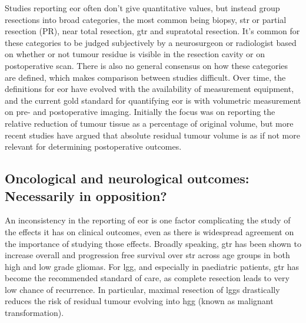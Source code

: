 Studies reporting \gls{eor} often don't give quantitative values, but instead group resections into broad categories, the most common being biopsy, \gls{str} or partial resection (PR), near total resection, \gls{gtr} and supratotal resection\autocite{Wykes2021,Karschnia2021}.
It's common for these categories to be judged subjectively by a neurosurgeon or radiologist based on whether or not tumour residue is visible in the resection cavity or on postoperative scan.
There is also no general consensus on how these categories are defined, which makes comparison between studies difficult\autocite{Karschnia2021}.
Over time, the definitions for \gls{eor} have evolved with the availability of measurement equipment, and the current gold standard for quantifying \gls{eor} is with volumetric measurement on pre- and postoperative imaging\autocite{Rincon-Torroella2019}.
Initially the focus was on reporting the relative reduction of tumour tissue as a percentage of original volume, but more recent studies have argued that absolute residual tumour volume is as if not more relevant for determining postoperative outcomes\autocite{Ius2012,Rincon-Torroella2019,Smith2008,Karschnia2021}.

\subsection{Oncological and neurological outcomes: Necessarily in opposition?}

An inconsistency in the reporting of \gls{eor} is one factor complicating the study of the effects it has on clinical outcomes, even as there is widespread agreement on the importance of studying those effects\autocite{Rincon-Torroella2019,Wykes2021,Weller2021}.
Broadly speaking, \gls{gtr} has been shown to increase overall and progression free survival over \gls{str} across age groups in both high \autocite{Hatoum2022, Han2020, Adams2016, McCrea2015, Bloch2012, McGirt2009, Kramm2006} and low grade \autocite{Keles2001, Pollack1995, Sanai2008} gliomas.
For \gls{lgg}, and especially in paediatric patients, \gls{gtr} has become the recommended standard of care, as complete resection leads to very low chance of recurrence\autocite{Berger1994}.
In particular, maximal resection of \glspl{lgg} drastically reduces the risk of residual tumour evolving into \gls{hgg} (known as malignant transformation)\autocite{Hervey-Jumper2016,Rincon-Torroella2019}.

